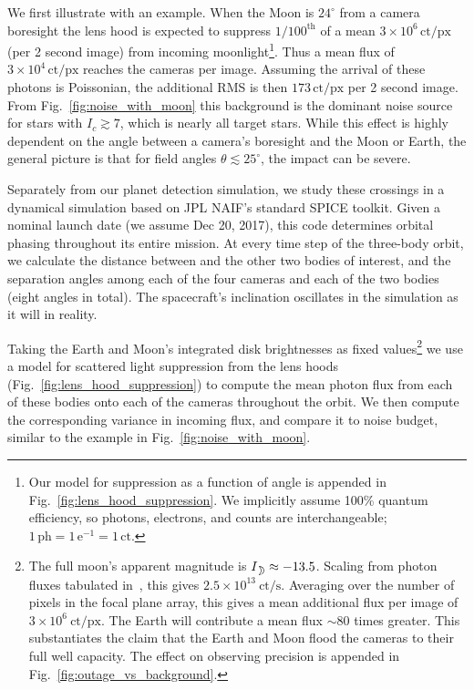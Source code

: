 We first illustrate with an example.
When the Moon is $24^\circ$ from a camera boresight the lens hood 
is expected to suppress $1/100^\mathrm{th}$ of a mean 
$3\times10^6\,\mathrm{ct/px}$ (per 2 second image) from incoming 
moonlight\footnote{Our model for suppression as a function of angle is 
appended in Fig.~\ref{fig:lens_hood_suppression}. We implicitly assume 100\% 
quantum efficiency, so photons, electrons, and counts are interchangeable; 
$1\,\mathrm{ph} = 1\,\mathrm{e^{-1}} = 1\,\mathrm{ct}$.}.
Thus a mean flux of $3\times10^4\,\mathrm{ct/px}$ reaches the cameras per 
image. 
Assuming the arrival of these photons is Poissonian, the additional RMS is 
then $173\,\mathrm{ct/px}$ per 2 second image.
From Fig.~\ref{fig:noise_with_moon} this background is the dominant noise 
source for stars with $I_c \gtrsim 7$, which is nearly all target stars.
While this effect is highly dependent on the angle between a camera's
boresight and the Moon or Earth, the general picture is that for field angles 
$\theta \lesssim25^{\circ}$, the impact can be severe.

Separately from our planet detection simulation, we study these 
crossings in a dynamical simulation based on JPL NAIF's standard SPICE toolkit.
Given a nominal launch date (we assume Dec 20, 2017), this code determines 
\tesss orbital phasing throughout its entire mission. 
At every time step of the three-body orbit, we calculate the distance between 
\tess and the other two bodies of interest, and the separation angles among 
each of the four cameras and each of the two bodies (eight angles in total). 
The spacecraft's inclination oscillates in the simulation as it will in 
reality.

Taking the Earth and Moon's integrated disk brightnesses as fixed 
values\footnote{The full moon's apparent magnitude is $I_\moon \approx -13.5$. 
Scaling from photon fluxes tabulated in~\citet{winn_photonflux_2013}, this 
gives $2.5\times10^{13}\ \mathrm{ct/s}$. Averaging over the number of pixels 
in the focal plane array, 
this gives a mean additional flux per image of $3\times10^6\ \mathrm{ct/px}$.
The Earth will contribute a mean flux $\sim {80}$ times greater.
This substantiates the claim that the Earth and Moon flood the cameras to 
their full well capacity. 
The effect on observing precision is appended in 
Fig.~\ref{fig:outage_vs_background}.} we use a model for scattered light 
suppression from 
the \tess lens hoods (Fig.~\ref{fig:lens_hood_suppression}) to compute the 
mean photon flux from each of these bodies onto each of the cameras throughout 
the orbit. We then compute the corresponding variance in incoming flux, and 
compare it to \tesss noise budget, similar to the example in 
Fig.~\ref{fig:noise_with_moon}.

